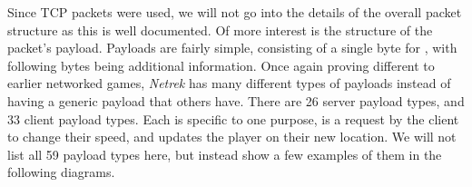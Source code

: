 Since TCP packets were used, we will not go into the details of the overall packet structure as this is well documented. Of more interest is the structure of the packet's payload. Payloads are fairly simple, consisting of a single byte for , with following bytes being additional information. Once again proving different to earlier networked games, \textit{Netrek} has many different types of payloads instead of having a generic  payload that others have. There are 26 server payload types, and 33 client payload types. Each is specific to one purpose, \eg{}  is a request by the client to change their speed, and  updates the player on their new location. We will not list all 59 payload types here, but instead show a few examples of them in the following diagrams.

